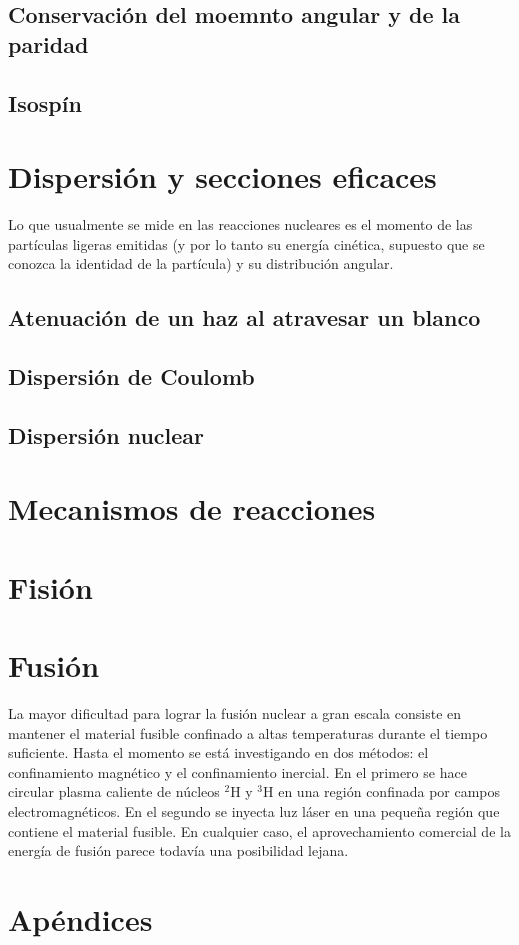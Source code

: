 \subsection{Conservación del moemnto angular y de la paridad}

\subsection{Isospín}

\section{Dispersión y secciones eficaces}

Lo que usualmente se mide en las reacciones nucleares es el momento de las partículas ligeras emitidas (y por lo tanto su energía cinética, supuesto que se conozca la identidad de la partícula) y su distribución angular. %

\subsection{Atenuación de un haz al atravesar un blanco}


\subsection{Dispersión de Coulomb}

\subsection{Dispersión nuclear}


\section{Mecanismos de reacciones}

\section{Fisión}

\section{Fusión}

La mayor dificultad para lograr la fusión nuclear a gran escala consiste en mantener el material fusible confinado a altas temperaturas durante el tiempo suficiente. Hasta el momento se está investigando en dos métodos: el confinamiento magnético y el confinamiento inercial. En el primero se hace circular plasma caliente de núcleos $^2$H y $^3$H en una región confinada por campos electromagnéticos. En el segundo se inyecta luz láser en una pequeña región que contiene el material fusible. En cualquier caso, el aprovechamiento comercial de la energía de fusión parece todavía una posibilidad lejana.

\section{Apéndices}